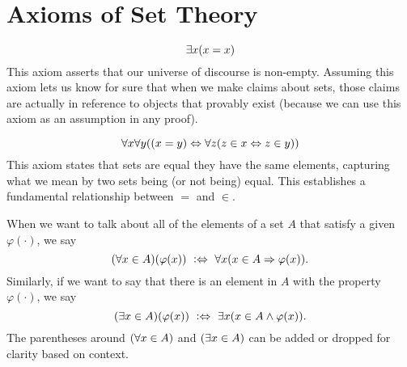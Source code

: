 \section{Axioms of Set Theory}\label{sec:axioms}

\setcounter{preaxiom}{-1}
\begin{axiom}[Existence]\label{ax:existence}
    \vspace{-\abovedisplayskip}
    \[
        \exists x \pn*{x = x}
    \]
    This axiom asserts that our universe of discourse is non-empty.
    Assuming this axiom lets us know for sure that when we make claims about sets,
    those claims are actually in reference to objects that provably exist
    (because we can use this axiom as an assumption in any proof).
\end{axiom}

\begin{axiom}[Extensionality]\label{ax:extensionality}
    \vspace{-\abovedisplayskip}
    \[
        \forall x \forall y \pn*{\pn*{x = y} \iff \forall z \pn*{z \in x \iff z \in y}}
    \]
    This axiom states that sets are equal \ifandonlyif they have the same elements,
    capturing what we mean by two sets being (or not being) equal.
    This establishes a fundamental relationship between \(=\) and \(\in\).
\end{axiom}

\begin{definition}
    When we want to talk about all of the elements of a set \(A\) that satisfy a given {\wff} \(\varphi(\cdot)\),
    we say
    \[
        \pn*{\forall x \in A}\pn*{\varphi(x)} \iffdefn \forall x \pn*{x \in A \implies \varphi(x)}.
    \]
    Similarly, if we want to say that there is an element in \(A\) with the property \(\varphi(\cdot)\),
    we say
    \[
        \pn*{\exists x \in A}\pn*{\varphi(x)} \iffdefn \exists x \pn*{x \in A \meet \varphi(x)}.
    \]
    The parentheses around \(\pn*{\forall x \in A}\) and \(\pn*{\exists x \in A}\)
    can be added or dropped for clarity based on context.
\end{definition}

